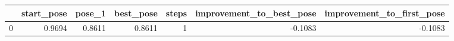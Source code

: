 \begin{tabular}{lrrrrrr}
\toprule
{} &  start\_pose &  pose\_1 &  best\_pose &  steps &  improvement\_to\_best\_pose &  improvement\_to\_first\_pose \\
\midrule
0 &      0.9694 &  0.8611 &     0.8611 &      1 &                   -0.1083 &                    -0.1083 \\
\bottomrule
\end{tabular}
